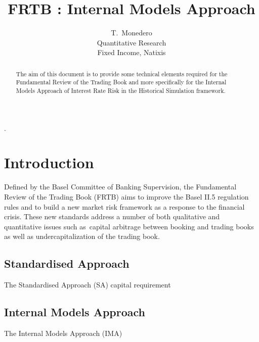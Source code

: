 \documentclass[3pt]{article}
\begin{document}
\title{FRTB : Internal Models Approach}
\author{T.\ Monedero \\
Quantitative Research\\
Fixed Income, Natixis\\
}
\maketitle

\begin{abstract}
The aim of this document is to provide some technical elements required for
the Fundamental Review of the Trading Book and more specifically for the
Internal Models Approach of Interest Rate Risk  in the Historical Simulation
framework.
\end{abstract}

\tableofcontents

.

\bigskip

\bigskip

\bigskip

\section{Introduction}

Defined by the Basel Committee of Banking Supervision, the Fundamental
Review of the Trading Book (FRTB) aims to improve the Basel II.5 regulation
rules and to build a new market risk framework as a response to the
financial crisis. These new standards address a number of both qualitative
and quantitative issues such as\ capital arbitrage between booking and
trading books as well as undercapitalization of the trading book.

\subsection{Standardised Approach}

The Standardised Approach (SA) capital requirement

\bigskip 

\bigskip 

\bigskip 

\bigskip 

\subsection{Internal Models Approach}

\bigskip The Internal Models Approach (IMA)
\end{document}
